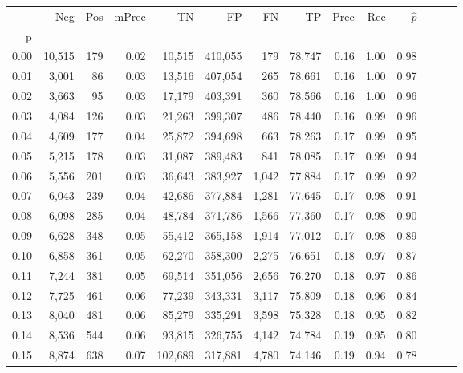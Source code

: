 \begin{tabular}{rrrrrrrrrrrrrr}
\toprule
{} &     Neg &    Pos & mPrec &       TN &       FP &      FN &      TP &  Prec &   Rec & $\hat{p}$ \\
p    &         &        &       &          &          &         &         &       &       &           \\
\midrule
0.00 &  10,515 &    179 &  0.02 &   10,515 &  410,055 &     179 &  78,747 &  0.16 &  1.00 &      0.98 \\
0.01 &   3,001 &     86 &  0.03 &   13,516 &  407,054 &     265 &  78,661 &  0.16 &  1.00 &      0.97 \\
0.02 &   3,663 &     95 &  0.03 &   17,179 &  403,391 &     360 &  78,566 &  0.16 &  1.00 &      0.96 \\
0.03 &   4,084 &    126 &  0.03 &   21,263 &  399,307 &     486 &  78,440 &  0.16 &  0.99 &      0.96 \\
0.04 &   4,609 &    177 &  0.04 &   25,872 &  394,698 &     663 &  78,263 &  0.17 &  0.99 &      0.95 \\
0.05 &   5,215 &    178 &  0.03 &   31,087 &  389,483 &     841 &  78,085 &  0.17 &  0.99 &      0.94 \\
0.06 &   5,556 &    201 &  0.03 &   36,643 &  383,927 &   1,042 &  77,884 &  0.17 &  0.99 &      0.92 \\
0.07 &   6,043 &    239 &  0.04 &   42,686 &  377,884 &   1,281 &  77,645 &  0.17 &  0.98 &      0.91 \\
0.08 &   6,098 &    285 &  0.04 &   48,784 &  371,786 &   1,566 &  77,360 &  0.17 &  0.98 &      0.90 \\
0.09 &   6,628 &    348 &  0.05 &   55,412 &  365,158 &   1,914 &  77,012 &  0.17 &  0.98 &      0.89 \\
0.10 &   6,858 &    361 &  0.05 &   62,270 &  358,300 &   2,275 &  76,651 &  0.18 &  0.97 &      0.87 \\
0.11 &   7,244 &    381 &  0.05 &   69,514 &  351,056 &   2,656 &  76,270 &  0.18 &  0.97 &      0.86 \\
0.12 &   7,725 &    461 &  0.06 &   77,239 &  343,331 &   3,117 &  75,809 &  0.18 &  0.96 &      0.84 \\
0.13 &   8,040 &    481 &  0.06 &   85,279 &  335,291 &   3,598 &  75,328 &  0.18 &  0.95 &      0.82 \\
0.14 &   8,536 &    544 &  0.06 &   93,815 &  326,755 &   4,142 &  74,784 &  0.19 &  0.95 &      0.80 \\
0.15 &   8,874 &    638 &  0.07 &  102,689 &  317,881 &   4,780 &  74,146 &  0.19 &  0.94 &      0.78 \\

\end{tabular}
